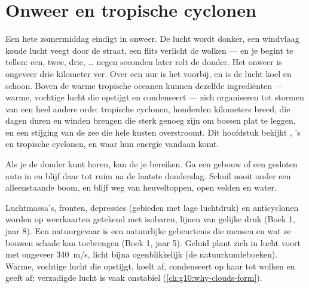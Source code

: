 \chapter{Onweer en tropische cyclonen}\label{ch:g10:storms-and-cyclones}

Een hete zomermiddag eindigt in onweer. De lucht wordt donker, een windvlaag
koude lucht veegt door de straat, een flits verlicht de wolken --- en je begint
te tellen: een, twee, drie, \ldots{} negen seconden later rolt de donder. Het
onweer is ongeveer drie kilometer ver. Over een uur is het voorbij, en is de
lucht koel en schoon. Boven de warme tropische oceanen kunnen dezelfde
ingrediënten --- warme, vochtige lucht die opstijgt en condenseert --- zich
organiseren tot stormen van een heel andere orde: tropische cyclonen, honderden
kilometers breed, die dagen duren en winden brengen die sterk genoeg zijn om
bossen plat te leggen, en een stijging van de zee die hele kusten overstroomt.
Dit hoofdstuk bekijkt , 's en tropische cyclonen, en waar hun
energie vandaan komt.

\begin{safety}
Als je de donder kunt horen, kan de  je bereiken. Ga een gebouw of een
gesloten auto in en blijf daar tot ruim na de laatste donderslag. Schuil nooit
onder een alleenstaande boom, en blijf weg van heuveltoppen, open velden en water.
\end{safety}

\begin{recall}
Luchtmassa's, fronten, depressies (gebieden met lage luchtdruk) en
anticyclonen worden op weerkaarten getekend met isobaren, lijnen van gelijke
druk (Boek 1, jaar 8). Een natuurgevaar is een natuurlijke gebeurtenis die
mensen en wat ze bouwen schade kan toebrengen (Boek 1, jaar 5). Geluid plant
zich in lucht voort met ongeveer \qty{340}{m/s}, licht bijna ogenblikkelijk (de
natuurkundeboeken). Warme, vochtige lucht die opstijgt, koelt af, condenseert op
haar  tot wolken en geeft  af; verzadigde lucht
is vaak onstabiel (\cref{ch:g10:why-clouds-form}).
\end{recall}

